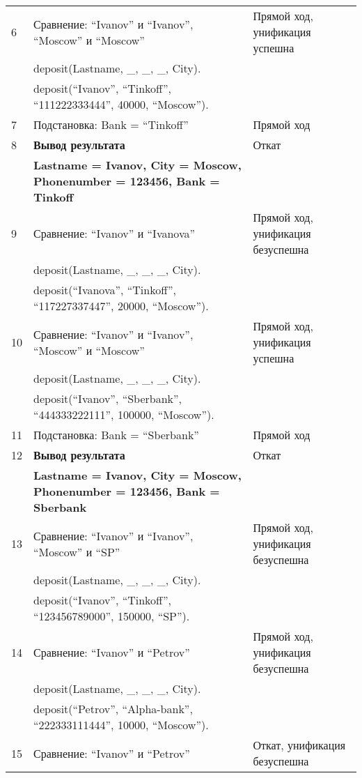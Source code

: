 {\begin{longtable}{|p{1.15cm}|p{8cm}|p{8cm}|}
    \hline
    6 & Сравнение: ``Ivanov'' и ``Ivanov'', ``Moscow'' и ``Moscow'' & Прямой ход, унификация успешна \\
      & deposit(Lastname, \_, \_, \_, City). & \\
      & deposit(``Ivanov'', ``Tinkoff'', ``111222333444'', 40000, ``Moscow''). & \\
    \hline
    7 & Подстановка: Bank = ``Tinkoff'' & Прямой ход \\
    \hline
    8 & \textbf{Вывод результата} & Откат \\
      & \textbf{Lastname = Ivanov, City = Moscow, Phonenumber = 123456, Bank = Tinkoff} & \\
    \hline
    9 & Сравнение: ``Ivanov'' и ``Ivanova'' & Прямой ход, унификация безуспешна \\
      & deposit(Lastname, \_, \_, \_, City). & \\
      & deposit(``Ivanova'', ``Tinkoff'', ``117227337447'', 20000, ``Moscow''). & \\
    \hline
    10 & Сравнение: ``Ivanov'' и ``Ivanov'', ``Moscow'' и ``Moscow'' & Прямой ход, унификация успешна \\
       & deposit(Lastname, \_, \_, \_, City). & \\
       & deposit(``Ivanov'', ``Sberbank'', ``444333222111'', 100000, ``Moscow''). & \\
    \hline
    11 & Подстановка: Bank = ``Sberbank'' & Прямой ход \\
    \hline
    12 & \textbf{Вывод результата} & Откат \\
       & \textbf{Lastname = Ivanov, City = Moscow, Phonenumber = 123456, Bank = Sberbank} & \\
    \hline
    13 & Сравнение: ``Ivanov'' и ``Ivanov'', ``Moscow'' и ``SP'' & Прямой ход, унификация безуспешна \\
       & deposit(Lastname, \_, \_, \_, City). & \\
       & deposit(``Ivanov'', ``Tinkoff'', ``123456789000'', 150000, ``SP''). & \\
    \hline
    14 & Сравнение: ``Ivanov'' и ``Petrov'' & Прямой ход, унификация безуспешна \\
       & deposit(Lastname, \_, \_, \_, City). & \\
       & deposit(``Petrov'', ``Alpha-bank'', ``222333111444'', 10000, ``Moscow''). & \\
    \hline
    15 & Сравнение: ``Ivanov'' и ``Petrov'' & Откат, унификация безуспешна \\

\end{longtable}}
